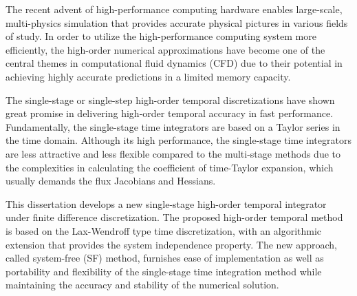 The recent advent of high-performance computing hardware enables large-scale, multi-physics simulation that provides accurate physical pictures in various fields of study. In order to utilize the high-performance computing system more efficiently, the high-order numerical approximations have become one of the central themes in computational fluid dynamics (CFD) due to their potential in achieving highly accurate predictions in a limited memory capacity.

The single-stage or single-step high-order temporal discretizations have shown great promise in delivering high-order temporal accuracy in fast performance. Fundamentally, the single-stage time integrators are based on a Taylor series in the time domain. Although its high performance, the single-stage time integrators are less attractive and less flexible compared to the multi-stage methods due to the complexities in calculating the coefficient of time-Taylor expansion, which usually demands the flux Jacobians and Hessians.

This dissertation develops a new single-stage high-order temporal integrator under finite difference discretization. The proposed high-order temporal method is based on the Lax-Wendroff type time discretization, with an algorithmic extension that provides the system independence property. The new approach, called system-free (SF) method, furnishes ease of implementation as well as portability and flexibility of the single-stage time integration method while maintaining the accuracy and stability of the numerical solution.

